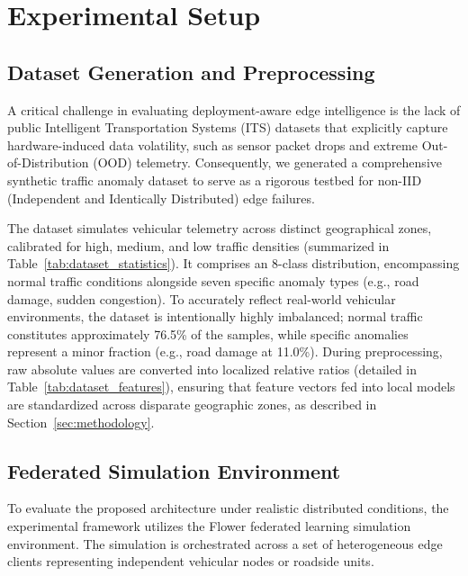 \section{Experimental Setup}
\label{sec:experiments}

\subsection{Dataset Generation and Preprocessing}

A critical challenge in evaluating deployment-aware edge intelligence is the lack of public Intelligent Transportation Systems (ITS) datasets that explicitly capture hardware-induced data volatility, such as sensor packet drops and extreme Out-of-Distribution (OOD) telemetry. Consequently, we generated a comprehensive synthetic traffic anomaly dataset to serve as a rigorous testbed for non-IID (Independent and Identically Distributed) edge failures.

The dataset simulates vehicular telemetry across distinct geographical zones, calibrated for high, medium, and low traffic densities (summarized in Table~\ref{tab:dataset_statistics}). It comprises an 8-class distribution, encompassing normal traffic conditions alongside seven specific anomaly types (e.g., road damage, sudden congestion). To accurately reflect real-world vehicular environments, the dataset is intentionally highly imbalanced; normal traffic constitutes approximately 76.5\% of the samples, while specific anomalies represent a minor fraction (e.g., road damage at 11.0\%). During preprocessing, raw absolute values are converted into localized relative ratios (detailed in Table~\ref{tab:dataset_features}), ensuring that feature vectors fed into local models are standardized across disparate geographic zones, as described in Section~\ref{sec:methodology}.





\subsection{Federated Simulation Environment}

To evaluate the proposed architecture under realistic distributed conditions, the experimental framework utilizes the Flower federated learning simulation environment. The simulation is orchestrated across a set of heterogeneous edge clients representing independent vehicular nodes or roadside units. 

